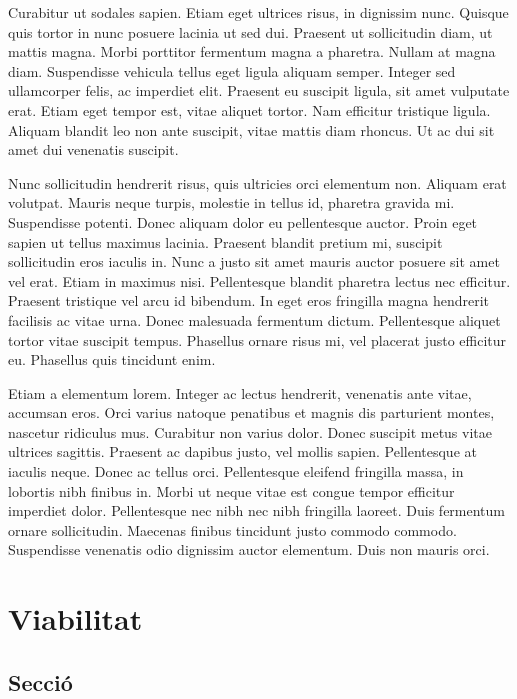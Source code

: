 \documentclass[a4paper,12pt,twoside]{ThesisStyle}
\begin{document}
Curabitur ut sodales sapien. Etiam eget ultrices risus, in dignissim nunc. Quisque quis tortor in nunc posuere lacinia ut sed dui. Praesent ut sollicitudin diam, ut mattis magna. Morbi porttitor fermentum magna a pharetra. Nullam at magna diam. Suspendisse vehicula tellus eget ligula aliquam semper. Integer sed ullamcorper felis, ac imperdiet elit. Praesent eu suscipit ligula, sit amet vulputate erat. Etiam eget tempor est, vitae aliquet tortor. Nam efficitur tristique ligula. Aliquam blandit leo non ante suscipit, vitae mattis diam rhoncus. Ut ac dui sit amet dui venenatis suscipit.

Nunc sollicitudin hendrerit risus, quis ultricies orci elementum non. Aliquam erat volutpat. Mauris neque turpis, molestie in tellus id, pharetra gravida mi. Suspendisse potenti. Donec aliquam dolor eu pellentesque auctor. Proin eget sapien ut tellus maximus lacinia. Praesent blandit pretium mi, suscipit sollicitudin eros iaculis in. Nunc a justo sit amet mauris auctor posuere sit amet vel erat. Etiam in maximus nisi. Pellentesque blandit pharetra lectus nec efficitur. Praesent tristique vel arcu id bibendum. In eget eros fringilla magna hendrerit facilisis ac vitae urna. Donec malesuada fermentum dictum. Pellentesque aliquet tortor vitae suscipit tempus. Phasellus ornare risus mi, vel placerat justo efficitur eu. Phasellus quis tincidunt enim.

Etiam a elementum lorem. Integer ac lectus hendrerit, venenatis ante vitae, accumsan eros. Orci varius natoque penatibus et magnis dis parturient montes, nascetur ridiculus mus. Curabitur non varius dolor. Donec suscipit metus vitae ultrices sagittis. Praesent ac dapibus justo, vel mollis sapien. Pellentesque at iaculis neque. Donec ac tellus orci. Pellentesque eleifend fringilla massa, in lobortis nibh finibus in. Morbi ut neque vitae est congue tempor efficitur imperdiet dolor. Pellentesque nec nibh nec nibh fringilla laoreet. Duis fermentum ornare sollicitudin. Maecenas finibus tincidunt justo commodo commodo. Suspendisse venenatis odio dignissim auctor elementum. Duis non mauris orci.



\chapter{Viabilitat}
\label{chp:viabilitat}

\section{Secció}
\end{document}
